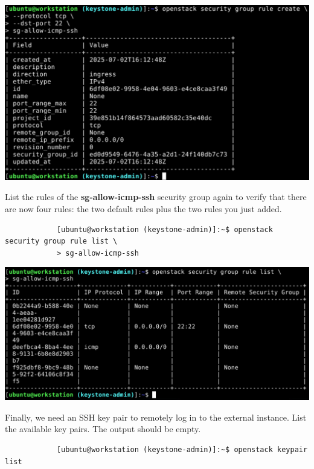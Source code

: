 \documentclass[letterpaper, 12pt]{article}
\begin{document}
\begin{enumerate}
\begin{labstep}
        \begin{center}
            \includegraphics[width=\linewidth]{images/part9/step27.png}
        \end{center}
    \end{labstep}

    \begin{labstep}
        List the rules of the \textbf{sg-allow-icmp-ssh} security group again to verify that there are now four rules: the two default rules plus the two rules you just added.
        \begin{lstlisting}
            [ubuntu@workstation (keystone-admin)]:~$ openstack security group rule list \
            > sg-allow-icmp-ssh
        \end{lstlisting}

        \begin{center}
            \includegraphics[width=\linewidth]{images/part9/step28.png}
        \end{center}
    \end{labstep}

    \begin{labstep}
        Finally, we need an SSH key pair to remotely log in to the external instance.
        List the available key pairs.
        The output should be empty.
        \begin{lstlisting}
            [ubuntu@workstation (keystone-admin)]:~$ openstack keypair list
        \end{lstlisting}


\end{labstep}
\end{enumerate}
\end{document}
